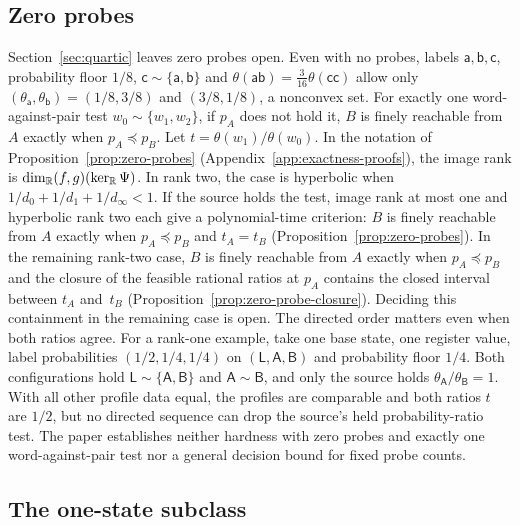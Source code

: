 \subsection{Zero probes}\label{sec:zero-probes}

Section~\ref{sec:quartic} leaves zero probes open. Even with no probes,
labels $\mathsf a,\mathsf b,\mathsf c$, probability floor $1/8$,
$\mathsf c\sim\{\mathsf a,\mathsf b\}$ and
$\theta(\mathsf{ab})=\tfrac3{16}\theta(\mathsf{cc})$ allow only
$(\theta_{\mathsf a},\theta_{\mathsf b})=(1/8,3/8)$ and $(3/8,1/8)$, a
nonconvex set. For exactly one word-against-pair test
$w_0\sim\{w_1,w_2\}$, if $p_A$ does not hold it, $B$ is finely reachable
from~$A$ exactly when $p_A\preceq p_B$.
Let $t=\theta(w_1)/\theta(w_0)$. In the notation of
Proposition~\ref{prop:zero-probes} (Appendix~\ref{app:exactness-proofs}),
the image rank is $\dim_{\mathbb{R}}(f,g)(\ker_{\mathbb{R}}\Psi)$. In rank two, the
case is hyperbolic when $1/d_0+1/d_1+1/d_\infty<1$. If the source holds the test,
image rank at most one and hyperbolic rank two each give a polynomial-time
criterion: $B$ is finely reachable from $A$ exactly when $p_A\preceq p_B$
and $t_A=t_B$ (Proposition~\ref{prop:zero-probes}). In the remaining
rank-two case, $B$ is finely reachable from $A$ exactly when
$p_A\preceq p_B$ and the closure of the feasible rational ratios at $p_A$
contains the closed interval between $t_A$ and~$t_B$
(Proposition~\ref{prop:zero-probe-closure}). Deciding this containment in
the remaining case is open. The directed order matters even when both
ratios agree. For a rank-one example, take one base state, one register value, label
probabilities $(1/2,1/4,1/4)$ on $(\mathsf L,\mathsf A,\mathsf B)$ and
probability floor $1/4$. Both configurations hold
$\mathsf L\sim\{\mathsf A,\mathsf B\}$ and $\mathsf A\sim\mathsf B$, and
only the source holds $\theta_{\mathsf A}/\theta_{\mathsf B}=1$. With all
other profile data equal, the profiles are comparable and both ratios $t$
are $1/2$, but no directed sequence can drop the source's held
probability-ratio test.
The paper establishes neither hardness with zero probes and exactly one
word-against-pair test nor a general decision bound for fixed probe
counts.

\subsection{The one-state subclass}\label{sec:one-state}

